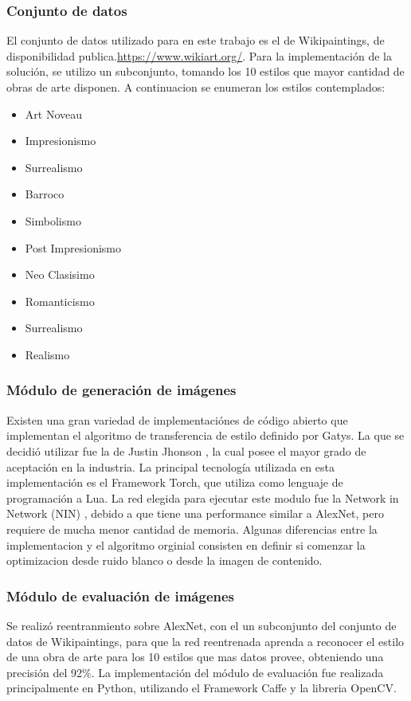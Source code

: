 \documentclass[a4paper,11pt,spanish]{book}
\begin{document}
      \subsubsection{Conjunto de datos}
	El conjunto de datos utilizado para en este trabajo es el de Wikipaintings, de disponibilidad publica.\url{https://www.wikiart.org/}. Para la implementación de la solución, 
	se utilizo un subconjunto, tomando los 10 estilos que mayor cantidad de obras de arte disponen. A continuacion se enumeran los estilos contemplados:
	\begin{itemize}
	 \item Art Noveau
	 \item Impresionismo
	 \item Surrealismo
	 \item Barroco
	 \item Simbolismo
	 \item Post Impresionismo
	 \item Neo Clasisimo
	 \item Romanticismo
	 \item Surrealismo
	 \item Realismo
	\end{itemize}

      
      \subsubsection{Módulo de generación de imágenes}
	Existen una gran variedad de implementaciónes de código abierto que implementan el algoritmo de transferencia de estilo definido por Gatys.
	La que se decidió utilizar fue la de Justin Jhonson \cite{Johnson:Neural_Style}, la cual posee el mayor grado de aceptación en la industria.
	La principal tecnología utilizada en esta implementación es el Framework Torch, que utiliza como lenguaje de programación a Lua.
	La red elegida para ejecutar este modulo fue la Network in Network (NIN) \cite{NIN}, debido a que tiene una performance similar a AlexNet, pero requiere de mucha menor cantidad 
	de memoria.
	Algunas diferencias entre la implementacion y el algoritmo orginial consisten en definir si comenzar la optimizacion desde ruido blanco o desde la imagen de contenido.
      \subsubsection{Módulo de evaluación de imágenes}
	Se realizó reentranmiento sobre AlexNet, con el un subconjunto del conjunto de datos de Wikipaintings, para que la red reentrenada aprenda a reconocer
	el estilo de una obra de arte para los 10 estilos que mas datos provee, obteniendo una precisión del 92\%.
	La implementación del módulo de evaluación fue realizada principalmente en Python, utilizando el Framework Caffe y la libreria OpenCV.
\end{document}
